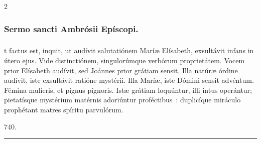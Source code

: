 \documentclass[9pt,twoside]{extarticle}
\begin{document}
\begin{multicols}{2}
{{\subsubsection*{\center {}}

\subsubsection*{\center Sermo sancti Ambrósii Epíscopi.}
\subsubsection*{\center {}}
t factus est, inquit, ut audívit salutatiónem Maríæ Elísabeth, exsultávit infans in útero ejus. Vide distinctiónem, singulorúmque verbórum proprietátem. Vocem prior Elísabeth audívit, sed Joánnes prior grátiam sensit. Illa natúræ órdine audívit, iste exsultávit ratióne mystérii. Illa Maríæ, iste Dómini sensit advéntum. Fémina mulíeris, et pignus pígnoris. Istæ grátiam loquúntur, illi intus operántur; pietatísque mystérium matérnis adoriúntur proféctibus~: duplicíque miráculo prophétant matres spíritu parvulórum.

\begin{tightlist}{}
\item {} 740.
\end{tightlist}

\begin{center}\textcolor{red}{\rule{\linewidth}{0.5pt}} \end{center}

\subsubsection*{\center {}}
\subsubsection*{\center {}}
}}
\end{multicols}
\end{document}
